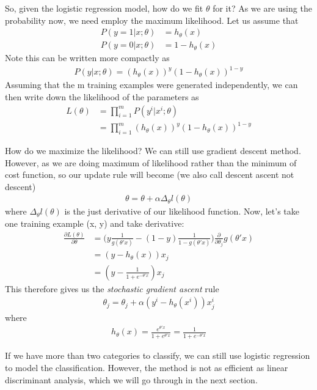 \documentclass[12pt]{article}
\theoremstyle{definition}
\numberwithin{equation}{section}
\numberwithin{figure}{section}
\numberwithin{table}{section}
\begin{document}
So, given the logistic regression model, how do we fit $\theta$ for it? As we are using the probability now, we need employ the maximum likelihood. Let us assume that
\begin{align*}
  P(y = 1 | x; \theta) & = h_{\theta}(x) \\
  P(y = 0 |x; \theta) & = 1 - h_{\theta}(x)
\end{align*}
Note this can be written more compactly as
\begin{align}
  P(y |x; \theta) = (h_{\theta}(x))^y (1 - h_{\theta}(x))^{1-y}
\end{align}
Assuming that the m training examples were generated independently, we can then write down the likelihood of the parameters as
\begin{align*}
  L(\theta) & = \prod_{i=1}^m P(y^{i}| x^{i}; \theta) \\
  & = \prod_{i=1}^m (h_{\theta}(x))^y (1 - h_{\theta}(x))^{1-y}
\end{align*}

How do we maximize the likelihood? We can still use gradient descent method. However, as we are doing maximum of likelihood rather than the minimum of cost function, so our update rule will become (we also call descent ascent not descent)
\begin{align*}
  \theta = \theta + \alpha \Delta_{\theta} l (\theta)
\end{align*}
where $\Delta_{\theta} l (\theta)$ is the just derivative of our likelihood function. Now, let's take one training example (x, y) and take derivative:
\begin{align*}
  \frac{\partial L(\theta)}{\partial \theta} & = \bigg(y \frac{1}{g(\theta' x)} - (1 - y) \frac{1}{1 - g(\theta' x)} \bigg) \frac{\partial }{\partial \theta_j} g(\theta' x) \\
  & = (y - h_{\theta}(x)) x_j \\
  & = (y - \frac{1}{1+e^{-\theta' x}})x_j
\end{align*}
This therefore gives us the \textit{stochastic gradient ascent} rule
\begin{align}
  \theta_j = \theta_j + \alpha (y^i - h_\theta(x^i))x_j^i
\end{align}
where
\begin{align*}
   h_{\theta}(x) = \frac{e^{\theta' x}}{ 1 + e^{\theta' x}} = \frac{1}{1+ e^{-\theta' x}}
\end{align*}

If we have more than two categories to classify, we can still use logistic regression to model the classification. However, the method is not as efficient as linear discriminant analysis, which we will go through in the next section.
\end{document}

